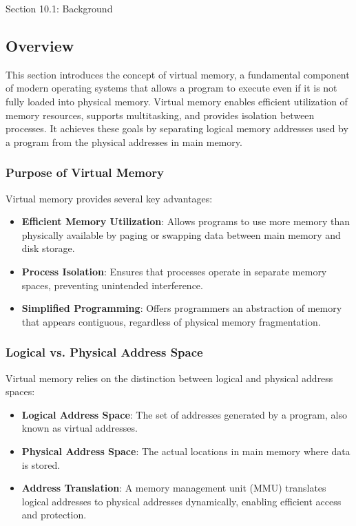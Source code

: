 \begin{notes}{Section 10.1: Background}
    \subsection*{Overview}

    This section introduces the concept of virtual memory, a fundamental component of modern operating systems that allows a program to execute even if it is not fully loaded into physical memory. 
    Virtual memory enables efficient utilization of memory resources, supports multitasking, and provides isolation between processes. It achieves these goals by separating logical memory addresses 
    used by a program from the physical addresses in main memory.
    
    \subsubsection*{Purpose of Virtual Memory}
    
    Virtual memory provides several key advantages:
    \begin{itemize}
        \item \textbf{Efficient Memory Utilization}: Allows programs to use more memory than physically available by paging or swapping data between main memory and disk storage.
        \item \textbf{Process Isolation}: Ensures that processes operate in separate memory spaces, preventing unintended interference.
        \item \textbf{Simplified Programming}: Offers programmers an abstraction of memory that appears contiguous, regardless of physical memory fragmentation.
    \end{itemize}
    
    \subsubsection*{Logical vs. Physical Address Space}
    
    Virtual memory relies on the distinction between logical and physical address spaces:
    \begin{itemize}
        \item \textbf{Logical Address Space}: The set of addresses generated by a program, also known as virtual addresses.
        \item \textbf{Physical Address Space}: The actual locations in main memory where data is stored.
        \item \textbf{Address Translation}: A memory management unit (MMU) translates logical addresses to physical addresses dynamically, enabling efficient access and protection.
    \end{itemize}
    

\end{notes}
